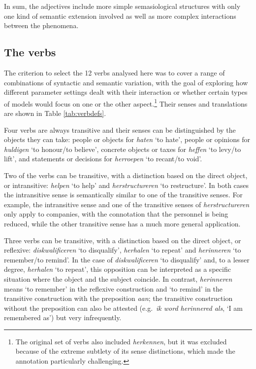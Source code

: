 \documentclass[
]{book}
\begin{document}
In sum, the adjectives include more simple semasiological structures with only one kind of semantic extension involved as well as more complex interactions between the phenomena.

\hypertarget{verbs}{%
\subsection{The verbs}\label{verbs}}

The criterion to select the 12 verbs analysed here was to cover a range of combinations of syntactic and semantic variation, with the goal of exploring how different parameter settings dealt with their interaction or whether certain types of models would focus on one or the other aspect.\footnote{The original set of verbs also included \emph{herkennen}, but it was excluded because of the extreme subtlety of its sense distinctions, which made the annotation particularly challenging.} Their senses and translations are shown in Table \ref{tab:verbdefs}.

Four verbs are always transitive and their senses can be distinguished by the objects they can take: people or objects for \emph{haten} `to hate', people or opinions for \emph{huldigen} `to honour/to believe', concrete objects or taxes for \emph{heffen} `to levy/to lift', and statements or decisions for \emph{herroepen} `to recant/to void'.

Two of the verbs can be transitive, with a distinction based on the direct object, or intransitive: \emph{helpen} `to help' and \emph{herstructureren} `to restructure'. In both cases the intransitive sense is semantically similar to one of the transitive senses. For example, the intransitive sense and one of the transitive senses of \emph{herstructureren} only apply to companies, with the connotation that the personnel is being reduced, while the other transitive sense has a much more general application.

Three verbs can be transitive, with a distinction based on the direct object, or reflexive: \emph{diskwalificeren} `to disqualify', \emph{herhalen} `to repeat' and \emph{herinneren} `to remember/to remind'. In the case of \emph{diskwalificeren} `to disqualify' and, to a lesser degree, \emph{herhalen} `to repeat', this opposition can be interpreted as a specific situation where the object and the subject coincide.
In contrast, \emph{herinneren} means `to remember' in the reflexive construction and `to remind' in the transitive construction with the preposition \emph{aan}; the transitive construction without the preposition can also be attested (e.g.~\emph{ik word herinnered als}, `I am remembered as') but very infrequently.
\end{document}
